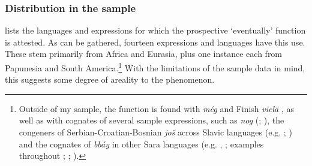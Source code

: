 \subsubsection[tocentry={}]{Distribution in the sample}
 lists the languages and expressions for which the prospective \lq eventually\rq{ }function is attested. As can be gathered, fourteen expressions and languages have this use. These stem primarily from Africa and Eurasia, plus one instance each from Papunesia and South America.\footnote{Outside of my sample, the function is found with  \textit{még} \parencite[s.v. \textit{még}]{BarcziOrszagh1992} and Finish \textit{vielä} \parencite[141]{Koenig1991}, as well as with cognates of several sample expressions, such as  \textit{nog} (\cite{Vandeweghe1984}; \cite[142]{Koenig1991}), the congeners of Serbian\hyp Croatian\hyp Bosnian \textit{još} across Slavic languages (e.g. \cite{Bogacki1989}; \cite[142]{Koenig1991}) and the cognates of  \textit{bbáy} in other Sara languages (e.g. \cite[244]{Palayer1989}, \citeyear[167]{Palayer1992}; examples throughout \cite{Keegan2014}; \cite{Thayer1978}; \cite{Vandame1963}).} With the limitations of the sample data in mind, this suggests some degree of areality to the phenomenon. 

